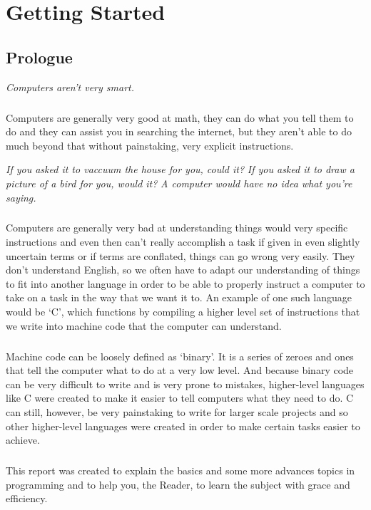 \chapter{Getting Started}

\newpage

\section{Prologue}

\begin{displayquote}
   \textit{Computers aren't very smart.}
\end{displayquote}

\paragraph{}
   Computers are generally very good at math, they can do what you tell them to do and they can assist you in searching the internet, but they aren't
   able to do much beyond that without painstaking, very explicit instructions.

\begin{displayquote}
   \textit{If you asked it to vaccuum the house for you, could it?}
   \textit{If you asked it to draw a picture of a bird for you, would it?}
   \textit{A computer would have no idea what you're saying.}
\end{displayquote}

\paragraph{}
   Computers are generally very bad at understanding things would very specific instructions and even then can't really accomplish a task if given in
   even slightly uncertain terms or if terms are conflated, things can go wrong very easily. They don't understand English, so we often have to adapt
   our understanding of things to fit into another language in order to be able to properly instruct a computer to take on a task in the way that we
   want it to. An example of one such language would be `C', which functions by compiling a higher level set of instructions that we write into
   machine code that the computer can understand.

\paragraph{}
   Machine code can be loosely defined as `binary'. It is a series of zeroes and ones that tell the computer what to do at a very low level. And
   because binary code can be very difficult to write and is very prone to mistakes, higher-level languages like C were created to make it easier to
   tell computers what they need to do. C can still, however, be very painstaking to write for larger scale projects and so other higher-level
   languages were created in order to make certain tasks easier to achieve.

\paragraph{}
   This report was created to explain the basics and some more advances topics in programming and to help you, the Reader, to learn the subject with
   grace and efficiency.

\newpage
